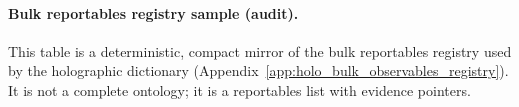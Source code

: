 \paragraph{Bulk reportables registry sample (audit).} \AuditTag This table is a deterministic, compact mirror of the bulk reportables registry used by the holographic dictionary (Appendix~\ref{app:holo_bulk_observables_registry}). It is not a complete ontology; it is a reportables list with evidence pointers.